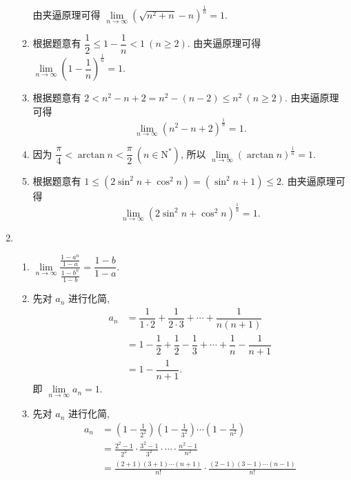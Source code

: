 \begin{enumerate}
\begin{enumerate}[(1)]
                由夹逼原理可得 $\lim\limits_{n\to\infty}(\sqrt{n^2 + n} - n)^{\frac 1n} = 1$.
            \item 
                根据题意有 $\dfrac 12 \leqslant 1 - \dfrac 1n < 1\ (n \geqslant 2)$.
                由夹逼原理可得 $\lim\limits_{n\to\infty}\left(1 - \dfrac 1n\right)^{\frac 1n} = 1$.
            \item 
                根据题意有 $2 < n^2 - n + 2 = n^2 - (n - 2) \leqslant n^2\ (n \geqslant 2)$.
                由夹逼原理可得 \[\lim\limits_{n\to\infty}(n^2 - n + 2)^{\frac 1n} = 1.\]
            \item 
                因为 $\dfrac{\pi}{4} < \arctan n < \dfrac{\pi}{2}\ (n\in\mathrm{N}^*)$, 所以 $\lim\limits_{n\to\infty}(\arctan n)^{\frac{1}{n}} = 1$.
            \item 
                根据题意有 $1 \leqslant (2\sin^2n + \cos^2n) = (\sin^2n + 1) \leqslant 2$.
                由夹逼原理可得 \[\lim\limits_{n\to\infty}(2\sin^2n + \cos^2n)^{\frac{1}{n}} = 1.\]
        \end{enumerate}
    \item
        \begin{enumerate}[(1)]
            \item 
                $\lim\limits_{n\to\infty}\dfrac{\frac{1-a^n}{1-a}}{\frac{1-b^n}{1-b}} = \dfrac{1-b}{1-a}$.
            \item 
                先对 $a_n$ 进行化简,
                \begin{align*}
                    a_n &= \dfrac{1}{1\cdot2} + \dfrac{1}{2\cdot3} + \cdots + \dfrac{1}{n\left(n+1\right)} \\
                        &= 1 - \dfrac 12 + \dfrac 12 - \dfrac 13 + \cdots + \dfrac 1n - \dfrac{1}{n+1} \\
                        &= 1 - \dfrac{1}{n+1}.
                \end{align*}
                即 $\lim\limits_{n\to\infty}a_n = 1$.
            \item
                先对 $a_n$ 进行化简,
                \begin{align*}
                    a_n &= \left(1-\frac{1}{2^2}\right)\left(1-\frac{1}{3^2}\right)\cdots\left(1-\frac{1}{n^2}\right) \\
                        &= \frac{2^2-1}{2^2} \cdot \frac{3^2-1}{3^2} \cdot \cdots \cdot \frac{n^2-1}{n^2} \\
                        &= \frac{(2+1)(3+1)\cdots(n+1)}{n!} \cdot \frac{(2-1)(3-1)\cdots(n-1)}{n!} \\

\end{align*}
\end{enumerate}
\end{enumerate}
